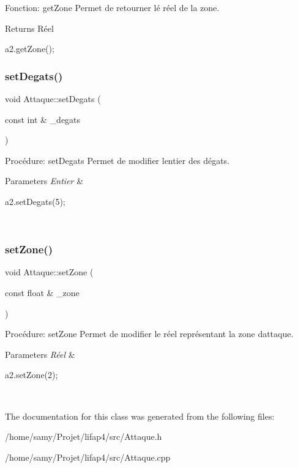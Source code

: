 Fonction\+: get\+Zone Permet de retourner lé réel de la zone. 

\begin{DoxyReturn}{Returns}
Réel 
\begin{DoxyCode}
a2.getZone();
\end{DoxyCode}
 
\end{DoxyReturn}
\mbox{\label{classAttaque_ad1af4e5ae848c40c7879fa4f9a56c674}} 
\subsubsection{\texorpdfstring{set\+Degats()}{setDegats()}}
{\footnotesize\ttfamily void Attaque\+::set\+Degats (\begin{DoxyParamCaption}\item[{const int \&}]{\+\_\+degats }\end{DoxyParamCaption})}



Procédure\+: set\+Degats Permet de modifier l\textquotesingle{}entier des dégats. 


\begin{DoxyParams}{Parameters}
{\em Entier} & 
\begin{DoxyCode}
a2.setDegats(5);
\end{DoxyCode}
 \\
\hline
\end{DoxyParams}
\mbox{\label{classAttaque_ae6dc5afd850f4518e937b8a2c08ac764}} 
\subsubsection{\texorpdfstring{set\+Zone()}{setZone()}}
{\footnotesize\ttfamily void Attaque\+::set\+Zone (\begin{DoxyParamCaption}\item[{const float \&}]{\+\_\+zone }\end{DoxyParamCaption})}



Procédure\+: set\+Zone Permet de modifier le réel représentant la zone d\textquotesingle{}attaque. 


\begin{DoxyParams}{Parameters}
{\em Réel} & 
\begin{DoxyCode}
a2.setZone(2);
\end{DoxyCode}
 \\
\hline
\end{DoxyParams}


The documentation for this class was generated from the following files\+:\begin{DoxyCompactItemize}
\item 
/home/samy/\+Projet/lifap4/src/Attaque.\+h\item 
/home/samy/\+Projet/lifap4/src/Attaque.\+cpp\end{DoxyCompactItemize}
